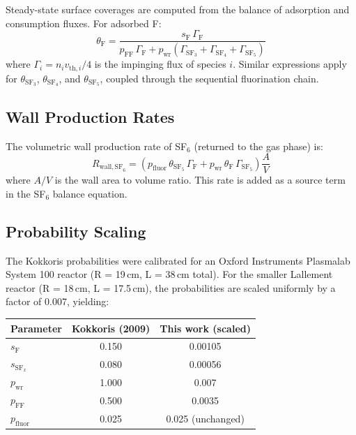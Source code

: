 \documentclass[11pt,a4paper]{article}
\newcommand{\SFx}{\mathrm{SF}_x}
\newcommand{\SFfive}{\mathrm{SF}_5}
\newcommand{\SFfour}{\mathrm{SF}_4}
\newcommand{\SFthree}{\mathrm{SF}_3}
\begin{document}
Steady-state surface coverages are computed from the balance of adsorption and consumption fluxes.  For adsorbed F:
\begin{equation}
\theta_\mathrm{F} = \frac{s_\mathrm{F} \, \Gamma_\mathrm{F}}{p_\mathrm{FF}\, \Gamma_\mathrm{F} + p_\mathrm{wr}(\Gamma_{\SFthree} + \Gamma_{\SFfour} + \Gamma_{\SFfive})}
\end{equation}
where $\Gamma_i = n_i v_{\mathrm{th},i}/4$ is the impinging flux of species $i$.  Similar expressions apply for $\theta_{\SFthree}$, $\theta_{\SFfour}$, and $\theta_{\SFfive}$, coupled through the sequential fluorination chain.

\subsection{Wall Production Rates}

The volumetric wall production rate of SF$_6$ (returned to the gas phase) is:
\begin{equation}
R_{\mathrm{wall,SF}_6} = \left( p_\mathrm{fluor}\, \theta_{\SFfive}\, \Gamma_\mathrm{F} + p_\mathrm{wr}\, \theta_\mathrm{F}\, \Gamma_{\SFfive} \right) \frac{A}{V}
\end{equation}
where $A/V$ is the wall area to volume ratio.  This rate is added as a source term in the SF$_6$ balance equation.

\subsection{Probability Scaling}

The Kokkoris probabilities were calibrated for an Oxford Instruments Plasmalab System 100 reactor (R = 19\,cm, L = 38\,cm total).  For the smaller Lallement reactor (R = 18\,cm, L = 17.5\,cm), the probabilities are scaled uniformly by a factor of 0.007, yielding:

\begin{center}
\small
\begin{tabular}{lcc}
\toprule
Parameter & Kokkoris (2009) & This work (scaled) \\
\midrule
$s_\mathrm{F}$ & 0.150 & 0.00105 \\
$s_{\SFx}$ & 0.080 & 0.00056 \\
$p_\mathrm{wr}$ & 1.000 & 0.007 \\
$p_\mathrm{FF}$ & 0.500 & 0.0035 \\
$p_\mathrm{fluor}$ & 0.025 & 0.025 (unchanged) \\
\bottomrule
\end{tabular}
\end{center}
\end{document}
